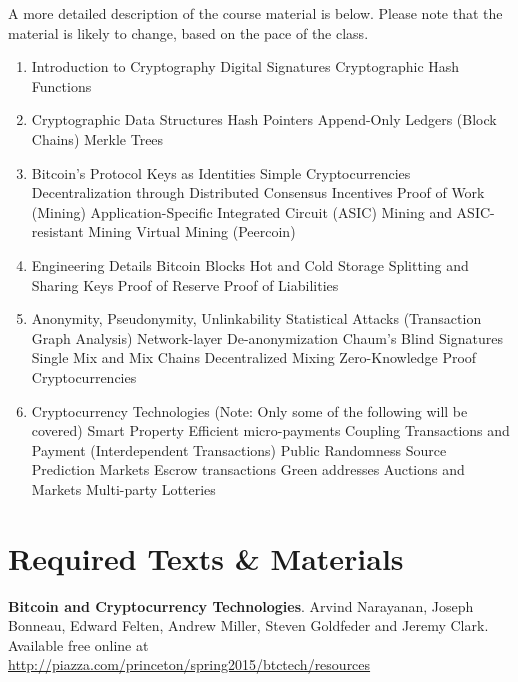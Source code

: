 \documentclass{article}
\begin{document}
\bigskip \bigskip

A more detailed description of the course material is below. Please note that the material is likely to change, based on the pace of the class.

\begin{enumerate}
\item Introduction to Cryptography
\subitem Digital Signatures
\subitem Cryptographic Hash Functions

\item Cryptographic Data Structures
\subitem Hash Pointers
\subitem Append-Only Ledgers (Block Chains)
\subitem Merkle Trees

\item Bitcoin's Protocol
\subitem Keys as Identities
\subitem Simple Cryptocurrencies
\subitem Decentralization through Distributed Consensus
\subitem Incentives
\subitem Proof of Work (Mining)
\subsubitem Application-Specific Integrated Circuit (ASIC) Mining and ASIC-resistant Mining
\subsubitem Virtual Mining (Peercoin)

\item Engineering Details
\subitem Bitcoin Blocks
\subitem Hot and Cold Storage
\subitem Splitting and Sharing Keys
\subitem Proof of Reserve
\subitem Proof of Liabilities

\item Anonymity, Pseudonymity, Unlinkability
\subitem Statistical Attacks (Transaction Graph Analysis)
\subitem Network-layer De-anonymization
\subitem Chaum's Blind Signatures
\subitem Single Mix and Mix Chains
\subitem Decentralized Mixing
\subitem Zero-Knowledge Proof Cryptocurrencies

\item Cryptocurrency Technologies (Note: Only some of the following will be covered)
\subitem Smart Property
\subitem Efficient micro-payments
\subitem Coupling Transactions and Payment (Interdependent Transactions)
\subitem Public Randomness Source
\subitem Prediction Markets
\subitem Escrow transactions
\subitem Green addresses
\subitem Auctions and Markets
\subitem Multi-party Lotteries

\end{enumerate}

\section*{Required Texts \& Materials}

\textbf{Bitcoin and Cryptocurrency Technologies}. Arvind Narayanan, Joseph Bonneau, Edward Felten, Andrew Miller, Steven Goldfeder and Jeremy Clark. Available free online at \url{http://piazza.com/princeton/spring2015/btctech/resources}\\
\end{document}
